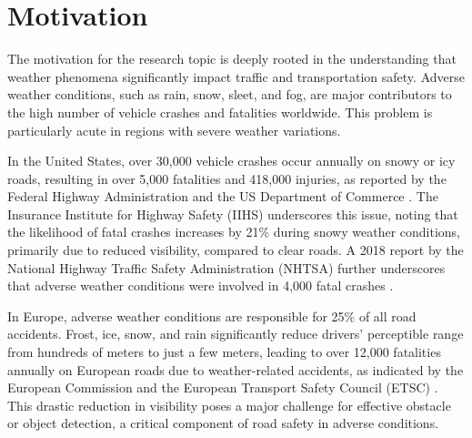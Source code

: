 \documentclass[report.tex]{subfiles}
\begin{document}

        
    
    \section{Motivation}

        The motivation for the research topic is deeply rooted in the understanding that weather phenomena significantly impact traffic and transportation safety. Adverse weather conditions, such as rain, snow, sleet, and fog, are major contributors to the high number of vehicle crashes and fatalities worldwide. This problem is particularly acute in regions with severe weather variations.

        In the United States, over 30,000 vehicle crashes occur annually on snowy or icy roads, resulting in over 5,000 fatalities and 418,000 injuries, as reported by the Federal Highway Administration \cite{federal-highway-administration-no-date} and the US Department of Commerce \cite{usDepartmentofCommerce2016}. The Insurance Institute for Highway Safety (IIHS) underscores this issue, noting that the likelihood of fatal crashes increases by 21\% during snowy weather conditions, primarily due to reduced visibility, compared to clear roads. A 2018 report by the National Highway Traffic Safety Administration (NHTSA) further underscores that adverse weather conditions were involved in 4,000 fatal crashes \cite{brumbelow2022light}.
        
        In Europe, adverse weather conditions are responsible for 25\% of all road accidents. Frost, ice, snow, and rain significantly reduce drivers' perceptible range from hundreds of meters to just a few meters, leading to over 12,000 fatalities annually on European roads due to weather-related accidents, as indicated by the European Commission and the European Transport Safety Council (ETSC) \cite{cookson-2022}. This drastic reduction in visibility poses a major challenge for effective obstacle or object detection, a critical component of road safety in adverse conditions.
        
\end{document}
